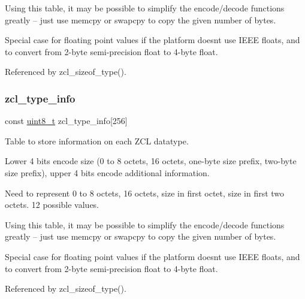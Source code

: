 Using this table, it may be possible to simplify the encode/decode functions greatly -- just use memcpy or swapcpy to copy the given number of bytes.

Special case for floating point values if the platform doesn\textquotesingle{}t use I\+E\+EE floats, and to convert from 2-\/byte semi-\/precision float to 4-\/byte float. 

Referenced by zcl\+\_\+sizeof\+\_\+type().

\mbox{\label{group__zcl__types_ga0f5737f60f1f37fb3b375e9fd5fe664d}} 
\subsubsection{\texorpdfstring{zcl\+\_\+type\+\_\+info}{zcl\_type\_info}\hspace{0.1cm}{\footnotesize\ttfamily [2/2]}}
{\footnotesize\ttfamily const \hyperlink{group__hal__dos_gae1affc9ca37cfb624959c866a73f83c2}{uint8\+\_\+t} zcl\+\_\+type\+\_\+info\mbox{[}256\mbox{]}}



Table to store information on each Z\+CL datatype. 

Lower 4 bits encode size (0 to 8 octets, 16 octets, one-\/byte size prefix, two-\/byte size prefix), upper 4 bits encode additional information.

Need to represent 0 to 8 octets, 16 octets, size in first octet, size in first two octets. 12 possible values.

Using this table, it may be possible to simplify the encode/decode functions greatly -- just use memcpy or swapcpy to copy the given number of bytes.

Special case for floating point values if the platform doesn\textquotesingle{}t use I\+E\+EE floats, and to convert from 2-\/byte semi-\/precision float to 4-\/byte float. 

Referenced by zcl\+\_\+sizeof\+\_\+type().

